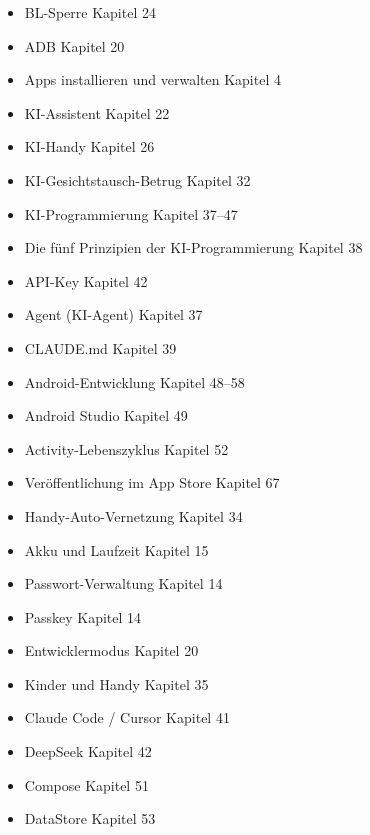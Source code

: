 


\begin{itemize}
  \item BL-Sperre Kapitel 24
  \item ADB Kapitel 20
  \item Apps installieren und verwalten Kapitel 4
  \item KI-Assistent Kapitel 22
  \item KI-Handy Kapitel 26
  \item KI-Gesichtstausch-Betrug Kapitel 32
  \item KI-Programmierung Kapitel 37–47
  \item Die fünf Prinzipien der KI-Programmierung Kapitel 38
  \item API-Key Kapitel 42
  \item Agent (KI-Agent) Kapitel 37
  \item CLAUDE.md Kapitel 39
  \item Android-Entwicklung Kapitel 48–58
  \item Android Studio Kapitel 49
  \item Activity-Lebenszyklus Kapitel 52
  \item Veröffentlichung im App Store Kapitel 67
\end{itemize}


\begin{itemize}
  \item Handy-Auto-Vernetzung Kapitel 34
  \item Akku und Laufzeit Kapitel 15
  \item Passwort-Verwaltung Kapitel 14
  \item Passkey Kapitel 14
  \item Entwicklermodus Kapitel 20
  \item Kinder und Handy Kapitel 35
  \item Claude Code / Cursor Kapitel 41
  \item DeepSeek Kapitel 42
  \item Compose Kapitel 51
  \item DataStore Kapitel 53
\end{itemize}


